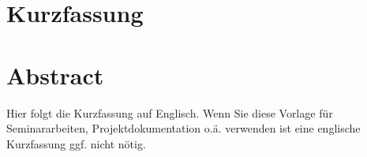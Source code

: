 \chapter*{Kurzfassung}







\newpage
\chapter*{Abstract}
Hier folgt die Kurzfassung auf Englisch. Wenn Sie diese Vorlage für Seminararbeiten, Projektdokumentation o.ä. verwenden ist eine englische Kurzfassung ggf. nicht nötig.
